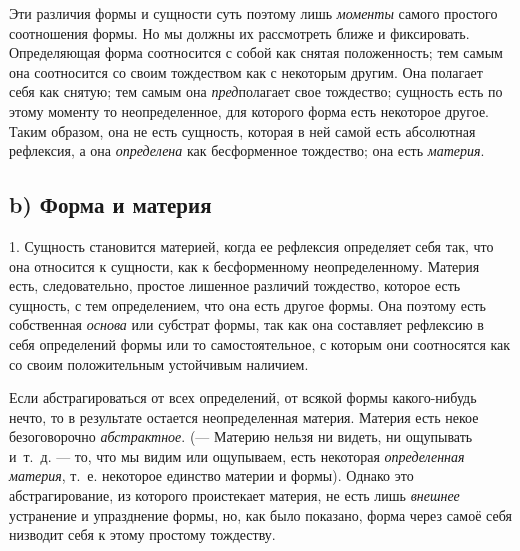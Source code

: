 Эти различия формы и сущности суть поэтому лишь
{\em моменты} самого простого соотношения формы. Но мы
должны их рассмотреть ближе и фиксировать. Определяющая форма соотносится с
собой как снятая положенность; тем самым она соотносится со своим
тождеством как с некоторым другим. Она полагает себя как снятую; тем самым
она {\em пред}полагает свое тождество; сущность есть по
этому моменту то неопределенное, для которого форма есть некоторое другое.
Таким образом, она не есть сущность, которая в ней самой есть абсолютная
рефлексия, а она {\em определена} как бесформенное
тождество; она есть {\em материя}.

\subsection[b) Форма и материя]{b) Форма и материя}
1. Сущность становится материей, когда ее
рефлексия определяет себя так, что она относится к сущности, как к
бесформенному неопределенному. Материя есть, следовательно, простое
лишенное различий тождество, которое есть сущность, с тем определением, что
она есть другое формы. Она поэтому есть собственная
{\em основа} или субстрат формы, так как она составляет
рефлексию в себя определений формы или то самостоятельное, с которым они
соотносятся как со своим положительным устойчивым наличием.

Если абстрагироваться от всех определений, от всякой формы какого-нибудь
нечто, то в результате остается неопределенная материя. Материя есть некое
безоговорочно {\em абстрактное}. (— Материю нельзя ни
видеть, ни ощупывать и~т.~д. — то, что мы видим или ощупываем, есть
некоторая {\em определенная материя}, т.~е. некоторое
единство материи и формы). Однако это абстрагирование, из которого
проистекает материя, не есть лишь {\em внешнее}
устранение и упразднение формы, но, как было показано, форма через самоё
себя низводит себя к этому простому тождеству.

